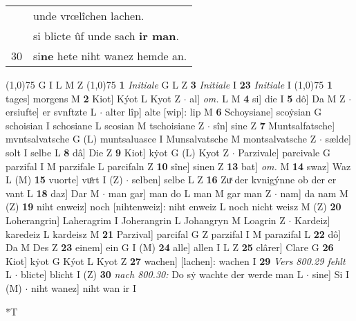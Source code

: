 \documentclass[8pt,a4paper,notitlepage]{article}
\begin{document}
\begin{table}[ht]
\begin{minipage}[t]{0.5\linewidth}
\begin{tabular}{rl}
 & unde vrœlîchen lachen.\\ 
 & si blicte ûf unde sach \textbf{ir man}.\\ 
30 & si\textbf{ne} hete niht wanez hemde an.\\ 
\end{tabular}
\scriptsize
\line(1,0){75} \newline
G I L M Z \newline
\line(1,0){75} \newline
\textbf{1} \textit{Initiale} G L Z  \textbf{3} \textit{Initiale} I  \textbf{23} \textit{Initiale} I  \newline
\line(1,0){75} \newline
\textbf{1} tages] morgens M \textbf{2} Kiot] Kýot L Kyot Z  $\cdot$ al] \textit{om.} L M \textbf{4} si] die I \textbf{5} dô] Da M Z  $\cdot$ ersiufte] er svnftzte L  $\cdot$ alter lîp] alte [wip]: lip M \textbf{6} Schoysiane] scoẏsian G schoisian I schosiane L scosian M tschoisiane Z  $\cdot$ sîn] sine Z \textbf{7} Muntsalfatsche] mvntsalvatsche G (L) muntsaluasce I Munsalvatsche M montsalvatsche Z  $\cdot$ sælde] solt I selbe L \textbf{8} dâ] Die Z \textbf{9} Kiot] kẏot G (L) Kyot Z  $\cdot$ Parzivale] parcivale G parzifal I M parzifale L parcifaln Z \textbf{10} sîne] sinen Z \textbf{13} bat] \textit{om.} M \textbf{14} swaz] Waz L (M) \textbf{15} vuorte] vuͤrt I (Z)  $\cdot$ selben] selbe L Z \textbf{16} Zuͯ der kvnigýnne ob der er vant L \textbf{18} daz] Dar M  $\cdot$ man gar] man do L man M gar man Z  $\cdot$ nam] da nam M (Z) \textbf{19} niht enweiz] noch [nihtenweiz]: niht enweiz L noch nicht weisz M (Z) \textbf{20} Loherangrin] Laheragrim I Joherangrin L Johangryn M Loagrin Z  $\cdot$ Kardeiz] karedeiz L kardeisz M \textbf{21} Parzival] parcifal G Z parzifal I M parazifal L \textbf{22} dô] Da M Des Z \textbf{23} einem] ein G I (M) \textbf{24} alle] allen I L Z \textbf{25} clârer] Clare G \textbf{26} Kiot] kẏot G Kýot L Kyot Z \textbf{27} wachen] [lachen]: wachen I \textbf{29} \textit{Vers 800.29 fehlt} L   $\cdot$ blicte] blicht I (Z) \textbf{30} \textit{nach 800.30:} Do sẏ wachte der werde man L   $\cdot$ sine] Si I (M)  $\cdot$ niht wanez] niht wan ir I \newline
\end{minipage}
\hspace{0.5cm}
\begin{minipage}[t]{0.5\linewidth}
\small
\begin{center}*T
\end{center}
\begin{tabular}{rl}

\end{tabular}
\end{minipage}
\end{table}
\end{document}
